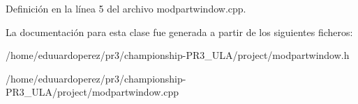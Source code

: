 Definición en la línea 5 del archivo modpartwindow.\+cpp.



La documentación para esta clase fue generada a partir de los siguientes ficheros\+:\begin{DoxyCompactItemize}
\item 
/home/eduuardoperez/pr3/championship-\/\+P\+R3\+\_\+\+U\+L\+A/project/modpartwindow.\+h\item 
/home/eduuardoperez/pr3/championship-\/\+P\+R3\+\_\+\+U\+L\+A/project/modpartwindow.\+cpp\end{DoxyCompactItemize}
